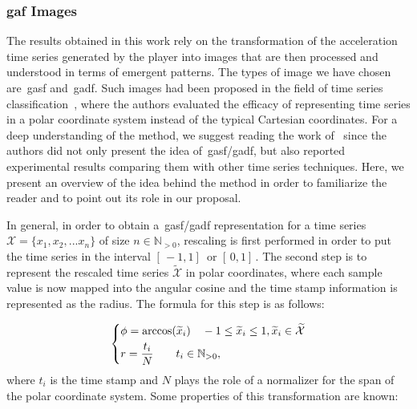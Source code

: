 \subsubsection{\glsdesc{gaf} Images}

The results obtained in this work rely on the transformation of the acceleration time series generated by the player into images that are then processed and understood in terms of emergent patterns. The types of image we have chosen are~\gls{gasf} and~\gls{gadf}. Such images had been proposed in the field of time series classification~\citep{wang_imaging_2015}, where the authors evaluated the efficacy of representing time series in a polar coordinate system instead of the typical Cartesian coordinates. For a deep understanding of the method, we suggest reading the work of~\cite{wang_imaging_2015} since the authors did not only present the idea of~\gls{gasf}/\gls{gadf}, but also reported experimental results comparing them with other time series techniques. Here, we present an overview of the idea behind the method in order to familiarize the reader and to point out its role in our proposal.

In general, in order to obtain a~\gls{gasf}/\gls{gadf} representation for a time series $\mathcal{X}=\{x_{1}, x_{2}, ... x_{n}\}$ of size $n \in \mathbb{N}_{>0}$, rescaling is first performed in order to put the time series in the interval $[\,-1,1] \,$ or $[\,0,1]\,$. The second step is to represent the rescaled time series $\widetilde{\mathcal{X}}$ in polar coordinates, where each sample value is now mapped into the angular cosine and the time stamp information is represented as the radius. 
The formula for this step is as follows:

\begin{equation}
\begin{dcases}
  \phi = \arccos(\widetilde{x}_{i}) \quad -1 \leq \widetilde{x}_{i} \leq 1, \widetilde{x}_{i} \in \widetilde{\mathcal{X}} \\
  r = \frac{t_{i}}{N} \quad \quad t_{i} \in \mathbb{N}_{>0},
\end{dcases}
\label{equation:GAF}
\end{equation} 
where $t_{i}$ is the time stamp and $N$ plays the role of a normalizer for the span of the polar coordinate system. Some properties of this transformation are known:

